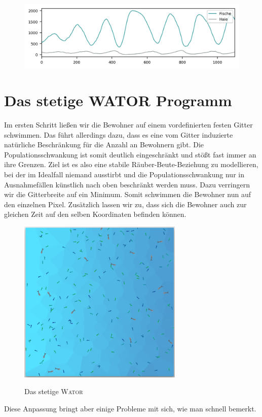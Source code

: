 \documentclass[a4paper,11pt]{article}
\newcommand{\wator}{\textsc{Wator }}
\theoremstyle{definition}
\numberwithin{equation}{section}
\begin{document}
	\begin{figure}
		\centering
		\includegraphics[width=\textwidth]{pictures/classic_big.png}
		\label{fig:classic_big}
	\end{figure}

	\section{Das stetige WATOR Programm}
	Im ersten Schritt ließen wir die Bewohner auf einem vordefinierten festen Gitter schwimmen. Das führt allerdings dazu, dass es eine vom Gitter induzierte natürliche Beschränkung für die Anzahl an Bewohnern gibt. Die Populationsschwankung ist somit deutlich eingeschränkt und stößt fast immer an ihre Grenzen. Ziel ist es also eine stabile Räuber-Beute-Beziehung zu modellieren, bei der im Idealfall niemand ausstirbt und die Populationsschwankung nur in Ausnahmefällen künstlich nach oben beschränkt werden muss.
	Dazu verringern wir die Gitterbreite auf ein Minimum. Somit schwimmen die Bewohner nun auf den einzelnen Pixel. Zusätzlich lassen wir zu, dass sich die Bewohner auch zur gleichen Zeit auf den selben Koordinaten befinden können.
	\begin{figure}
		\centering
		\includegraphics[width=0.7\textwidth]{pictures/continuous.png}
		\label{fig:continuous}
		\caption{Das stetige \wator}
	\end{figure}
	Diese Anpassung bringt aber einige Probleme mit sich, wie man schnell bemerkt.\newline
	
\end{document}
